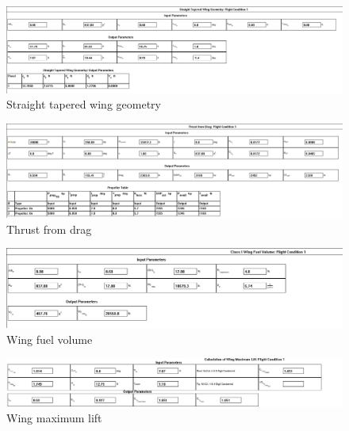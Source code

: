 \documentclass[conf]{new-aiaa}
\begin{document}
\begin{figure}[H]
	\centering
	\includegraphics[width=\textwidth]{TwinSeaLionReport2Printouts/StraightTaperedWingGeometry}
	\caption{Straight tapered wing geometry}
	\label{fig:StraightTaperedWingGeometry}
\end{figure}
\begin{figure}[H]
	\centering
	\includegraphics[width=\textwidth]{TwinSeaLionReport2Printouts/thrustFromDrag}
	\caption{Thrust from drag}
	\label{fig:thrustFromDrag}
\end{figure}
\begin{figure}[H]
	\centering
	\includegraphics[width=\textwidth]{TwinSeaLionReport2Printouts/WingFuelVolume}
	\caption{Wing fuel volume}
	\label{fig:WingFuelVolume}
\end{figure}
\begin{figure}[H]
	\centering
	\includegraphics[width=\textwidth]{TwinSeaLionReport2Printouts/WingMaximumLift}
	\caption{Wing maximum lift}
	\label{fig:WingMaximumLift}
\end{figure}
\end{document}
